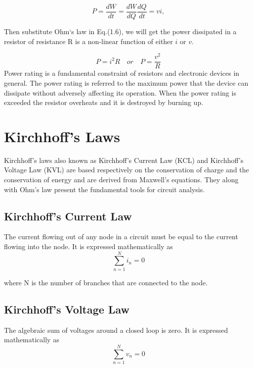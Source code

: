 \documentclass[a4 paper]{article}
\numberwithin{equation}{section}
\newcommand{\0}{\mathbf{0}}
\begin{document}
\begin{equation}
P = \frac{dW}{dt} = \frac{dW}{dQ}\frac{dQ}{dt}=vi,
\end{equation}

Then substitute Ohm`s law in Eq.(1.6), we will get the power dissipated in a resistor of resistance R is a non-linear function of either $i$ or $v$.

\begin{equation}
P = i^2R \quad or \quad P = \frac{v^2}{R}
\end{equation}
Power rating is a fundamental constraint of resistors and electronic devices in general. The power rating is referred to the maximum power that the device can dissipate without adversely affecting its operation. When the power rating is exceeded the resistor overheats and it is destroyed by burning up. 





\section{Kirchhoff’s Laws}
Kirchhoff’s laws also known as Kirchhoff’s Current Law (KCL) and Kirchhoff’s Voltage Law (KVL) are based respectively on the conservation of charge and the conservation of energy and are derived from Maxwell’s equations. They along with Ohm's law present the fundamental tools for circuit analysis.
\subsection{Kirchhoff’s Current Law}
The current flowing out of any node in a circuit
must be equal to the current flowing into the node. It is expressed mathematically as
\begin{equation}
\sum_{n=1}^{N}i_n=0
\end{equation}

where N is the number of branches that are connected to the node. 
\subsection{Kirchhoff’s Voltage Law}
The algebraic sum of voltages around a closed loop is zero. It is expressed mathematically as
\begin{equation}
\sum_{n=1}^{N}v_n=0
\end{equation}
\end{document}
